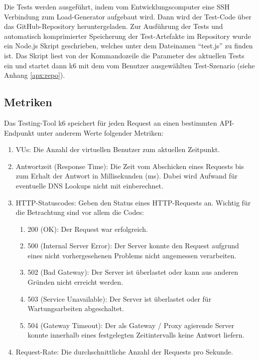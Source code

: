 Die Tests werden ausgeführt, indem vom Entwicklungscomputer eine SSH Verbindung zum Load-Generator aufgebaut wird. Dann wird der Test-Code über das GitHub-Repository heruntergeladen. Zur Ausführung der Tests und automatisch komprimierter Speicherung der Test-Artefakte im Repository wurde ein Node.js Skript geschrieben, welches unter dem Dateinamen "`test.js"' zu finden ist. Das Skript liest von der Kommandozeile die Parameter des aktuellen Tests ein und startet dann k6 mit dem vom Benutzer ausgewählten Test-Szenario (siehe Anhang \ref{apx:repo}). 

\subsection{Metriken}
Das Testing-Tool k6 speichert für jeden Request an einen bestimmten API-Endpunkt unter anderem Werte folgender Metriken:
\begin{enumerate}
    \item \acp{VU}: Die Anzahl der virtuellen Benutzer zum aktuellen Zeitpunkt.
    
    \item Antwortzeit (Response Time): Die Zeit vom Abschicken eines Requests bis zum Erhalt der Antwort in Millisekunden (ms). Dabei wird Aufwand für eventuelle DNS Lookups nicht mit einberechnet\cite{noauthor_metrics_nodate}. 
    
    \item HTTP-Statuscodes: Geben den Status eines HTTP-Requests an. Wichtig für die Betrachtung sind vor allem die Codes:
        \begin{enumerate}
            \item 200 (OK): Der Request war erfolgreich\cite{noauthor_200_nodate}.
            \item 500 (Internal Server Error): Der Server konnte den Request aufgrund eines nicht vorhergesehenen Problems nicht angemessen verarbeiten\cite{noauthor_500_nodate}.
            \item 502 (Bad Gateway): Der Server ist überlastet oder kann aus anderen Gründen nicht erreicht werden\cite{noauthor_error_nodate}.
            \item 503 (Service Unavailable): Der Server ist überlastet oder für Wartungsarbeiten abgeschaltet\cite{noauthor_503_nodate}.
            \item 504 (Gateway Timeout): Der als Gateway / Proxy agierende Server konnte innerhalb eines festgelegten Zeitintervalls keine Antwort liefern\cite{noauthor_http_nodate}.
        \end{enumerate}
        
    \item Request-Rate: Die durchschnittliche Anzahl der Requests pro Sekunde.
\end{enumerate}

